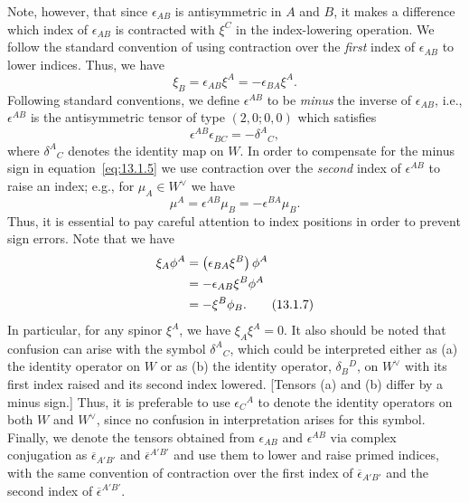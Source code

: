 Note, however, that since \(\epsilon_{AB}\) is antisymmetric in \(A\) and \(B\), it
makes a difference which index of \(\epsilon_{AB}\) is contracted with \(\xi^C\) in
the index-lowering operation. We follow the standard convention of using contraction
over the \emph{first} index of \(\epsilon_{AB}\) to lower indices. Thus, we have
\begin{equation}
  \xi_B=\epsilon_{AB}\xi^A=-\epsilon_{BA}\xi^A.
  \tag{13.1.4}\label{eq:13.1.4}
\end{equation}
Following standard conventions, we define \(\epsilon^{AB}\) to be \emph{minus} the
inverse of \(\epsilon_{AB}\), i.e., \(\epsilon^{AB}\) is the antisymmetric tensor of
type \((2,0;0,0)\) which satisfies
\begin{equation}
  \epsilon^{AB}\epsilon_{BC}=-\delta^A{}_C,
  \tag{13.1.5}\label{eq:13.1.5}
\end{equation}
where \(\delta^A{}_C\) denotes the identity map on \(W\). In order to compensate for
the minus sign in equation~\eqref{eq:13.1.5} we use contraction over the
\emph{second} index of \(\epsilon^{AB}\) to raise an index; e.g., for
\(\mu_A\in W^\vee\) we have
\begin{equation}
  \mu^A=\epsilon^{AB}\mu_B=-\epsilon^{BA}\mu_B.
  \tag{13.1.6}\label{eq:13.1.6}
\end{equation}
Thus, it is essential to pay careful attention to index positions in order to prevent
sign errors. Note that we have
\begin{align}
  \xi_A\phi^A
    &=\left(\epsilon_{BA}\xi^B\right)\phi^A \notag\\
    &=-\epsilon_{AB}\xi^B\phi^A \notag\\
    &=-\xi^B\phi_B.
  \tag{13.1.7}\label{eq:13.1.7}
\end{align}
In particular, for any spinor \(\xi^A\), we have \(\xi_A\xi^A=0\). It also should be
noted that confusion can arise with the symbol \(\delta^A{}_C\), which could be
interpreted either as (a) the identity operator on \(W\) or as (b) the identity
operator, \(\delta_B{}^D\), on \(W^\vee\) with its first index raised and its second
index lowered. [Tensors (a) and (b) differ by a minus sign.] Thus, it is preferable
to use \(\epsilon_C{}^A\) to denote the identity operators on both \(W\) and \(W^\vee\),
since no confusion in interpretation arises for this symbol. Finally, we denote the
tensors obtained from \(\epsilon_{AB}\) and \(\epsilon^{AB}\) via complex
conjugation as \(\overline\epsilon_{A'B'}\) and
\(\overline\epsilon^{A'B'}\) and use them to lower and raise primed indices, with
the same convention of contraction over the first index of
\(\overline\epsilon_{A'B'}\) and the second index of
\(\overline\epsilon^{A'B'}\).

